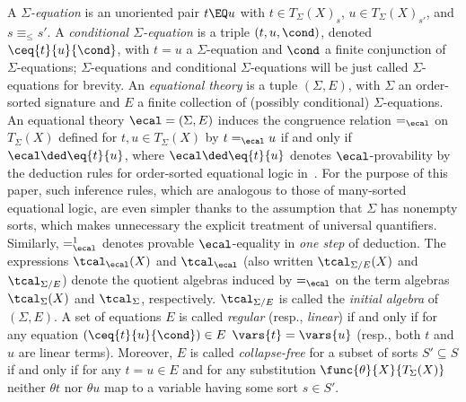 A {\em $\Sigma$-equation} is an unoriented pair $t \EQ u$ with $t \in
T_\Sigma(X)_{s}$, $u \in T_\Sigma(X)_{s'}$, and $s \equiv_\leq s'$.  A
{\em conditional $\Sigma$-equation} is a triple $(t,u,\cond)$, denoted
$\ceq{t}{u}{\cond}$, with $t = u$ a $\Sigma$-equation and $\cond$ a
finite conjunction of $\Sigma$-equations; $\Sigma$-equations and
conditional $\Sigma$-equations will be just called $\Sigma$-equations
for brevity.  An {\em equational theory} is a tuple $(\Sigma,E)$, with
$\Sigma$ an order-sorted signature and $E$ a finite collection of
(possibly conditional) $\Sigma$-equations.  An equational theory
$\ecal = (\Sigma,E)$ induces the congruence relation $=_\ecal$ on
$T_\Sigma(X)$ defined for $t,u \in T_\Sigma(X)$ by $t =_\ecal u$ if
and only if $\ecal \ded \eq{t}{u}$, where $\ecal \ded \eq{t}{u}$
denotes $\ecal$-provability by the deduction rules for order-sorted
equational logic in~\cite{meseguer-membership-1998}. For the purpose
of this paper, such inference rules, which are analogous to those of
many-sorted equational logic, are even simpler thanks to the
assumption that $\Sigma$ has nonempty sorts, which makes unnecessary
the explicit treatment of universal quantifiers.  Similarly,
$=_\ecal^1$ denotes provable $\ecal$-equality in {\em one step} of
deduction.
The expressions $\tcal_{\ecal}(X)$ and $\tcal_\ecal$ (also written
$\tcal_{\Sigma/E}(X)$ and $\tcal_{\Sigma/E}$) denote the quotient
algebras induced by $=_\ecal$ on the term algebras $\tcal_\Sigma(X)$
and $\tcal_\Sigma$, respectively.  $\tcal_{\Sigma/E}$ is called the
{\em initial algebra} of $(\Sigma,E)$. A set of equations $E$ is
called \emph{regular} (resp., {\em linear}) if and only if for any
equation $(\ceq{t}{u}{\cond}) \in E$ $\vars{t} = \vars{u}$ (resp.,
both $t$ and $u$ are linear terms). Moreover, $E$ is called {\em
  collapse-free} for a subset of sorts $S'\subseteq S$ if and only if
for any $t=u \in E$ and for any substitution
$\func{\theta}{X}{T_\Sigma(X)}$ neither $\theta t$ nor $\theta u$ map
to a variable having some sort $s \in S'$.
